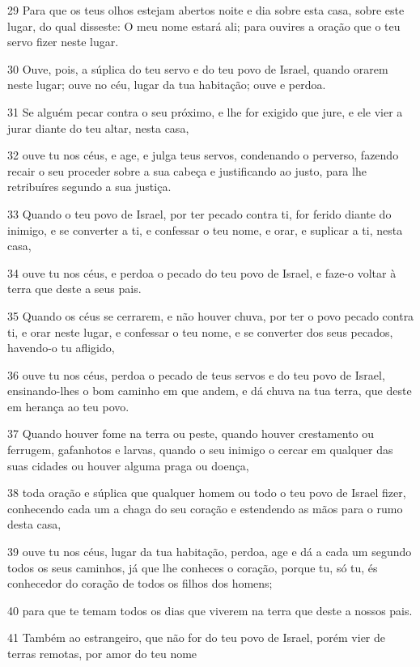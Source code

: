 \par 29 Para que os teus olhos estejam abertos noite e dia sobre esta casa, sobre este lugar, do qual disseste: O meu nome estará ali; para ouvires a oração que o teu servo fizer neste lugar.
\par 30 Ouve, pois, a súplica do teu servo e do teu povo de Israel, quando orarem neste lugar; ouve no céu, lugar da tua habitação; ouve e perdoa.
\par 31 Se alguém pecar contra o seu próximo, e lhe for exigido que jure, e ele vier a jurar diante do teu altar, nesta casa,
\par 32 ouve tu nos céus, e age, e julga teus servos, condenando o perverso, fazendo recair o seu proceder sobre a sua cabeça e justificando ao justo, para lhe retribuíres segundo a sua justiça.
\par 33 Quando o teu povo de Israel, por ter pecado contra ti, for ferido diante do inimigo, e se converter a ti, e confessar o teu nome, e orar, e suplicar a ti, nesta casa,
\par 34 ouve tu nos céus, e perdoa o pecado do teu povo de Israel, e faze-o voltar à terra que deste a seus pais.
\par 35 Quando os céus se cerrarem, e não houver chuva, por ter o povo pecado contra ti, e orar neste lugar, e confessar o teu nome, e se converter dos seus pecados, havendo-o tu afligido,
\par 36 ouve tu nos céus, perdoa o pecado de teus servos e do teu povo de Israel, ensinando-lhes o bom caminho em que andem, e dá chuva na tua terra, que deste em herança ao teu povo.
\par 37 Quando houver fome na terra ou peste, quando houver crestamento ou ferrugem, gafanhotos e larvas, quando o seu inimigo o cercar em qualquer das suas cidades ou houver alguma praga ou doença,
\par 38 toda oração e súplica que qualquer homem ou todo o teu povo de Israel fizer, conhecendo cada um a chaga do seu coração e estendendo as mãos para o rumo desta casa,
\par 39 ouve tu nos céus, lugar da tua habitação, perdoa, age e dá a cada um segundo todos os seus caminhos, já que lhe conheces o coração, porque tu, só tu, és conhecedor do coração de todos os filhos dos homens;
\par 40 para que te temam todos os dias que viverem na terra que deste a nossos pais.
\par 41 Também ao estrangeiro, que não for do teu povo de Israel, porém vier de terras remotas, por amor do teu nome
